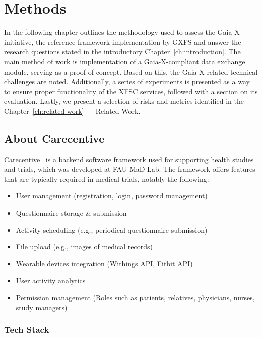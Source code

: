 \chapter{Methods}\label{ch:methods}

\begin{chapterabstract}
    In the following chapter outlines the methodology used to assess the Gaia-X initiative, the reference framework implementation by GXFS and answer the research questions stated in the introductory Chapter~\ref{ch:introduction}.%
    The main method of work is implementation of a Gaia-X-compliant data exchange module, serving as a proof of concept.
    Based on this, the Gaia-X-related technical challenges are noted.
    Additionally, a series of experiments is presented as a way to ensure proper functionality of the XFSC services, followed with a section on its evaluation.
    Lastly, we present a selection of risks and metrics identified in the Chapter~\ref{ch:related-work} --- Related Work.%
\end{chapterabstract}

\section{About Carecentive}\label{sec:about-carecentive}

Carecentive~\cite{carecentive} is a backend software framework used for supporting health studies and trials, which was developed at FAU MaD Lab.
The framework offers features that are typically required in medical trials, notably the following:
\begin{itemize}
    \item User management (registration, login, password management)
    \item Questionnaire storage \& submission
    \item Activity scheduling (e.g., periodical questionnaire submission)
    \item File upload (e.g., images of medical records)
    \item Wearable devices integration (Withings API, Fitbit API)
    \item User activity analytics
    \item Permission management (Roles such as patients, relatives, physicians, nurses, study managers)
\end{itemize}

\subsection{Tech Stack}\label{subsec:tech-stack}

